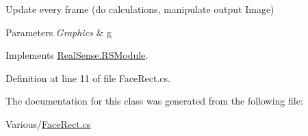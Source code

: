 Update every frame (do calculations, manipulate output Image) 
\begin{DoxyParams}{Parameters}
{\em Graphics} & g \\
\hline
\end{DoxyParams}


Implements \hyperlink{class_real_sense_1_1_r_s_module_a2ec830b7932ee7c0077d473f81c73867}{Real\+Sense.\+R\+S\+Module}.



Definition at line 11 of file Face\+Rect.\+cs.



The documentation for this class was generated from the following file\+:\begin{DoxyCompactItemize}
\item 
Various/\hyperlink{_face_rect_8cs}{Face\+Rect.\+cs}\end{DoxyCompactItemize}
